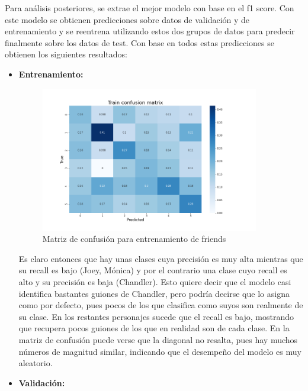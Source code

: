 Para análisis posteriores, se extrae el mejor modelo con base en el f1 score. Con este modelo se obtienen predicciones sobre datos de validación y de entrenamiento y se reentrena utilizando estos dos grupos de datos para predecir finalmente sobre los datos de test. Con base en todos estas predicciones se obtienen los siguientes resultados:

\begin{itemize}
    \item \textbf{Entrenamiento:}
    

    \begin{figure}
        \centering
        \includegraphics[width = 0.9\textwidth]{results/friends/deepModels/Train.png}
        \caption{Matriz de confusión para entrenamiento de friends}
        \label{fig:my_label}
    \end{figure}
    
    Es claro entonces que hay unas clases cuya precisión es muy alta mientras que su recall es bajo (Joey, Mónica) y por el contrario una clase cuyo recall es alto y su precisión es baja (Chandler). Esto quiere decir que el modelo casi identifica bastantes guiones de Chandler, pero podría decirse que lo asigna como por defecto, pues pocos de los que clasifica como suyos son realmente de su clase. En los restantes personajes sucede que el recall es bajo, mostrando que recupera pocos guiones de los que en realidad son de cada clase. En la matriz de confusión puede verse que la diagonal no resalta, pues hay muchos números de magnitud similar, indicando que el desempeño del modelo es muy aleatorio.

    \item \textbf{Validación:}
    


\end{itemize}
